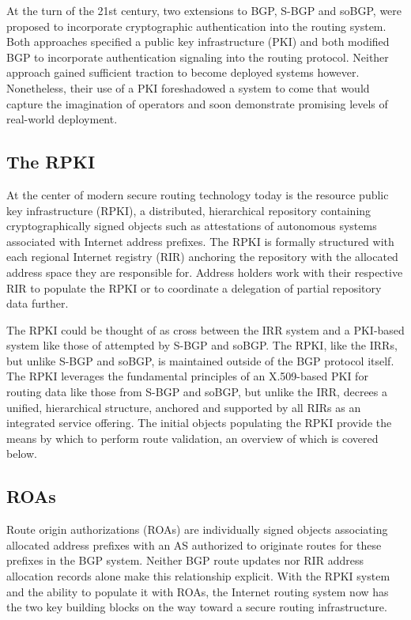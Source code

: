 \documentclass[sigconf]{acmart}
\begin{document}
At the turn of the 21st century, two extensions to BGP, S-BGP and soBGP,
were proposed to incorporate cryptographic authentication into the
routing system.\cite{kent_secure_2000}\cite{white_securing_2003}  Both
approaches specified a public key infrastructure (PKI) and both modified
BGP to incorporate authentication signaling into the routing protocol.
Neither approach gained sufficient traction to become deployed systems
however.  Nonetheless, their use of a PKI foreshadowed a system to come
that would capture the imagination of operators and soon demonstrate
promising levels of real-world deployment.

\subsection{The RPKI}

At the center of modern secure routing technology today is the resource
public key infrastructure (RPKI), a distributed, hierarchical repository
containing cryptographically signed objects such as attestations of
autonomous systems associated with Internet address
prefixes.\cite{lepinski_infrastructure_2012}  The RPKI is formally
structured with each regional Internet registry (RIR) anchoring the
repository with the allocated address space they are responsible for.
Address holders work with their respective RIR to populate the RPKI or
to coordinate a delegation of partial repository data further.

The RPKI could be thought of as cross between the IRR system and a
PKI-based system like those of attempted by S-BGP and soBGP.  The RPKI,
like the IRRs, but unlike S-BGP and soBGP, is maintained outside of the
BGP protocol itself.  The RPKI leverages the fundamental principles of
an X.509-based PKI for routing data like those from S-BGP and soBGP, but
unlike the IRR, decrees a unified, hierarchical structure, anchored and
supported by all RIRs as an integrated service offering.  The initial
objects populating the RPKI provide the means by which to perform route
validation, an overview of which is covered below.

\subsection{ROAs}

Route origin authorizations (ROAs) are individually signed objects
associating allocated address prefixes with an AS authorized to
originate routes for these prefixes in the BGP system.  Neither BGP
route updates nor RIR address allocation records alone make this
relationship explicit.  With the RPKI system and the ability to populate
it with ROAs, the Internet routing system now has the two key building
blocks on the way toward a secure routing infrastructure.
\end{document}
